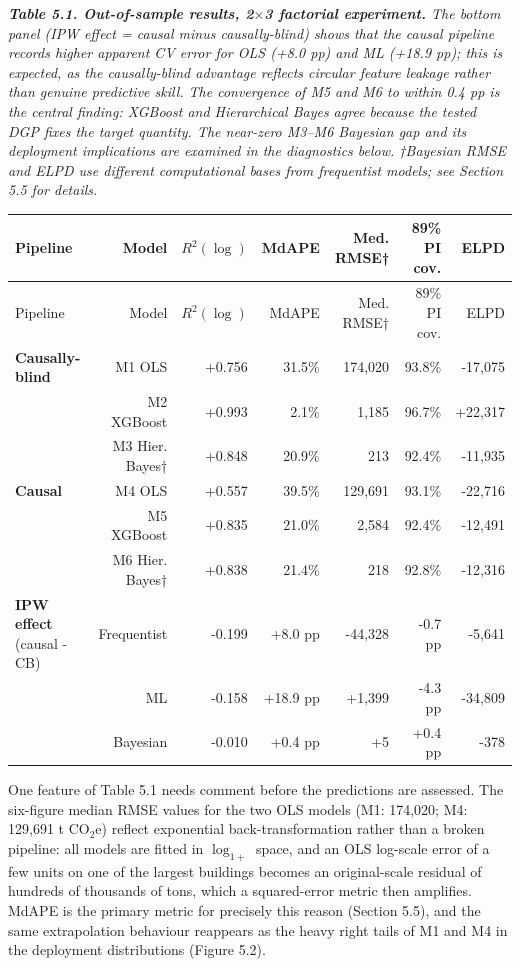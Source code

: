 \par\medskip\noindent
{\small\itshape \textbf{Table 5.1. Out-of-sample results, 2$\times$3 factorial experiment.} The bottom panel (IPW effect = causal minus causally-blind) shows that the causal pipeline records higher apparent CV error for OLS (+8.0 pp) and ML (+18.9 pp); this is expected, as the causally-blind advantage reflects circular feature leakage rather than genuine predictive skill. The convergence of M5 and M6 to within 0.4 pp is the central finding: XGBoost and Hierarchical Bayes agree because the tested DGP fixes the target quantity. The near-zero M3--M6 Bayesian gap and its deployment implications are examined in the diagnostics below. †Bayesian RMSE and ELPD use different computational bases from frequentist models; see Section 5.5 for details.\par}
\nopagebreak\medskip\nopagebreak
{
\footnotesize
\setlength{\tabcolsep}{5pt}
\renewcommand{\arraystretch}{1.15}
\begin{longtable}{lrrrrrr}
\toprule
Pipeline & Model & $R^2(\log)$ & MdAPE & Med. RMSE† & 89\% PI cov. & ELPD \\
\midrule
\endfirsthead
\toprule
Pipeline & Model & $R^2(\log)$ & MdAPE & Med. RMSE† & 89\% PI cov. & ELPD \\
\midrule
\endhead
\bottomrule
\endlastfoot
\textbf{Causally-blind} & M1 OLS & +0.756 & 31.5\% & 174,020 & 93.8\% & -17,075 \\
 & M2 XGBoost & +0.993 & 2.1\% & 1,185 & 96.7\% & +22,317 \\
 & M3 Hier. Bayes† & +0.848 & 20.9\% & 213 & 92.4\% & -11,935 \\
\textbf{Causal} & M4 OLS & +0.557 & 39.5\% & 129,691 & 93.1\% & -22,716 \\
 & M5 XGBoost & +0.835 & 21.0\% & 2,584 & 92.4\% & -12,491 \\
 & M6 Hier. Bayes† & +0.838 & 21.4\% & 218 & 92.8\% & -12,316 \\
\textbf{IPW effect} (causal - CB) & Frequentist & -0.199 & +8.0 pp & -44,328 & -0.7 pp & -5,641 \\
 & ML & -0.158 & +18.9 pp & +1,399 & -4.3 pp & -34,809 \\
 & Bayesian & -0.010 & +0.4 pp & +5 & +0.4 pp & -378 \\
\end{longtable}
}
\par\medskip

One feature of Table 5.1 needs comment before the predictions are assessed. The six-figure median RMSE values for the two OLS models (M1: 174,020; M4: 129,691 t CO$_2$e) reflect exponential back-transformation rather than a broken pipeline: all models are fitted in $\log_{1+}$ space, and an OLS log-scale error of a few units on one of the largest buildings becomes an original-scale residual of hundreds of thousands of tons, which a squared-error metric then amplifies. MdAPE is the primary metric for precisely this reason (Section 5.5), and the same extrapolation behaviour reappears as the heavy right tails of M1 and M4 in the deployment distributions (Figure 5.2).

